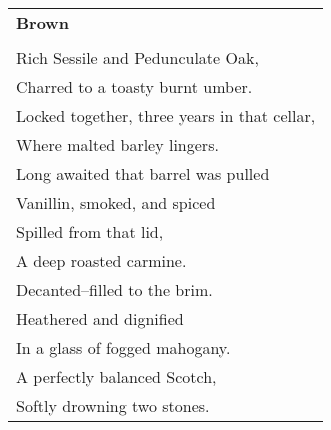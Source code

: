 \documentclass{article}
\begin{document}
\begin{center}
\begin{tabular}{l}
\textbf{Brown} \\
\\
Rich Sessile and Pedunculate Oak, \\
Charred to a toasty burnt umber. \\
Locked together, three years in that cellar, \\
Where malted barley lingers. \\ %
Long awaited that barrel was pulled \\
Vanillin, smoked, and spiced \\
Spilled from that lid, \\
A deep roasted carmine. \\
Decanted--filled to the brim. \\
Heathered and dignified \\
In a glass of fogged mahogany. \\
A perfectly balanced Scotch, \\
Softly drowning two stones. \\
\end{tabular}
\end{center}
\end{document}
